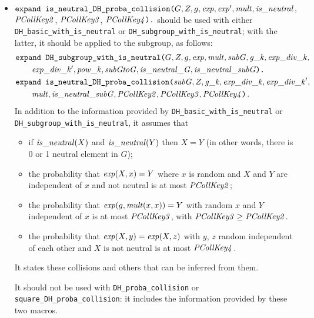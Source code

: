 \documentclass{article}
\begin{document}
\begin{itemize}
\begin{itemize}
\begin{itemize}
     \item $\texttt{expand\ is\_neutral\_DH\_proba\_collision(}G, Z, g,
       \vn{exp}, \vn{exp}', \vn{mult}, \vn{is\_neutral}$, $\mathit{PCollKey2}$,
       $\mathit{PCollKey3}$, $\mathit{PCollKey4}\texttt{).}$
       should be used with either
       \texttt{DH\_basic\_with\_is\_neutral}
       or \texttt{DH\_subgroup\_with\_is\_neutral};
       with the latter,
       it should be applied to the subgroup, as follows:
       \begin{align*}
         &\texttt{expand\ DH\_subgroup\_with\_is\_neutral(}G, Z, g, \vn{exp}, \vn{mult}, \vn{subG}, \vn{g\_k}, \vn{exp\_div\_k},\\
         &\qquad\vn{exp\_div\_k'}, \vn{pow\_k}, \vn{subGtoG}, \vn{is\_neutral\_G}, \vn{is\_neutral\_subG}\texttt{).}\\
         &\texttt{expand\ is\_neutral\_DH\_proba\_collision(}\vn{subG}, Z, \vn{g\_k}, \vn{exp\_div\_k}, \vn{exp\_div\_k}', \\
         &\qquad\vn{mult}, \vn{is\_neutral\_subG}, \vn{PCollKey2}, \vn{PCollKey3}, \vn{PCollKey4}\texttt{).}
       \end{align*}
       In addition to the information provided by
       \texttt{DH\_basic\_with\_is\_neutral} or
       \texttt{DH\_subgroup\_with\_is\_neutral}, it assumes that
       \begin{itemize}
       \item if $\mathit{is\_neutral}(X)$ and $\mathit{is\_neutral}(Y)$ then $X = Y$
         (in other words, there is 0 or 1 neutral element in $G$);
       \item the probability that $\mathit{exp}(X,x) = Y$ where $x$ is random and
         $X$ and $Y$ are independent of $x$ and not neutral is at most
         $\mathit{PCollKey2}$;
       \item the probability that $\mathit{exp}(g, \mathit{mult}(x,x)) = Y$ with
         random $x$ and $Y$ independent of $x$ is at most $\mathit{PCollKey3}$,
         with $\mathit{PCollKey3} \geq \mathit{PCollKey2}$.
       \item the probability that $\mathit{exp}(X,y) = \mathit{exp}(X,z)$ with $y$,
         $z$ random independent of each other and $X$ is not neutral is
         at most $\mathit{PCollKey4}$.
       \end{itemize}
       It states these collisions and others that can be inferred from them.

       It should not be used with \texttt{DH\_proba\_collision}
       or \texttt{square\_DH\_proba\_collision}: it includes the information
       provided by these two macros.
       

\end{itemize}
\end{itemize}
\end{itemize}
\end{document}
